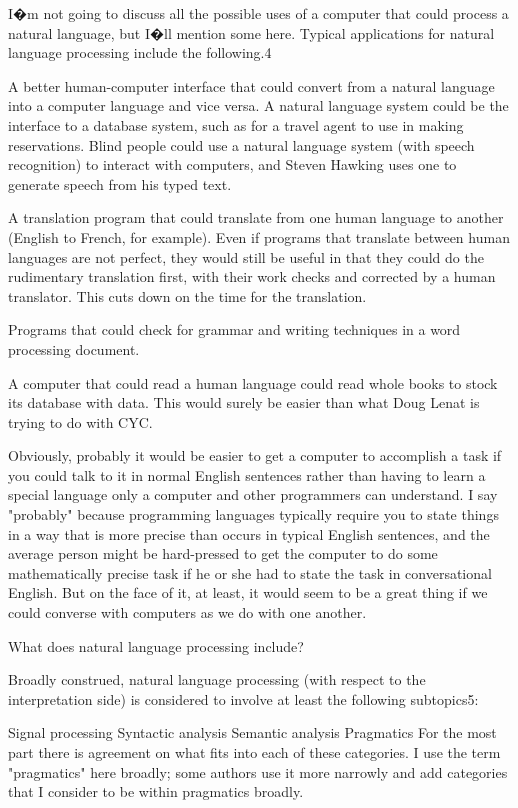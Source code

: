 I�m not going to discuss all the possible uses of a computer that could process a natural language, but I�ll mention some here. Typical applications for natural language processing include the following.4

A better human-computer interface that could convert from a natural language into a computer language and vice versa. A natural language system could be the interface to a database system, such as for a travel agent to use in making reservations. Blind people could use a natural language system (with speech recognition) to interact with computers, and Steven Hawking uses one to generate speech from his typed text.

A translation program that could translate from one human language to another (English to French, for example). Even if programs that translate between human languages are not perfect, they would still be useful in that they could do the rudimentary translation first, with their work checks and corrected by a human translator. This cuts down on the time for the translation.

Programs that could check for grammar and writing techniques in a word processing document.

A computer that could read a human language could read whole books to stock its database with data. This would surely be easier than what Doug Lenat is trying to do with CYC.

Obviously, probably it would be easier to get a computer to accomplish a task if you could talk to it in normal English sentences rather than having to learn a special language only a computer and other programmers can understand. I say "probably" because programming languages typically require you to state things in a way that is more precise than occurs in typical English sentences, and the average person might be hard-pressed to get the computer to do some mathematically precise task if he or she had to state the task in conversational English. But on the face of it, at least, it would seem to be a great thing if we could converse with computers as we do with one another.

What does natural language processing include?

Broadly construed, natural language processing (with respect to the interpretation side) is considered to involve at least the following subtopics5:

Signal processing
Syntactic analysis
Semantic analysis
Pragmatics
For the most part there is agreement on what fits into each of these categories. I use the term "pragmatics" here broadly; some authors use it more narrowly and add categories that I consider to be within pragmatics broadly.

